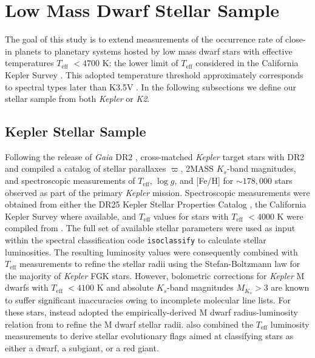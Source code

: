 \documentclass[twocolumn]{emulateapj}
\newcommand{\gaia}[1]{\emph{Gaia}#1}
\newcommand{\kepler}[1]{\emph{Kepler}#1}
\newcommand{\ktwo}[1]{\emph{K2}#1}
\newcommand{\teff}[1]{$T_{\text{eff}}$#1}
\newcommand{\logg}[1]{$\log{g}$#1}
\begin{document}
\section{Low Mass Dwarf Stellar Sample} \label{sect:stars}
The goal of this study is to extend measurements of the occurrence rate of close-in planets to planetary systems hosted
by low mass dwarf stars with effective temperatures \teff{} $<4700$ K: the lower limit of \teff{}
considered in the California Kepler Survey \citep[CKS;][]{fulton17}.
This adopted temperature threshold approximately corresponds to spectral types later than
K3.5V \citep{pecaut13}. In the following subsections we define our stellar sample from both \kepler{} or \ktwo{.}

\subsection{Kepler Stellar Sample} \label{sect:kep}
Following the release of \gaia{} DR2 \citep{lindegren18}, \cite{berger18} cross-matched \kepler{} target stars
with DR2 and compiled a catalog of stellar
parallaxes $\varpi$, 2MASS $K_s$-band magnitudes, and spectroscopic measurements of \teff{,} \logg{,} and [Fe/H]
for $\sim 178,000$ stars observed as part of the primary \kepler{} mission. Spectroscopic measurements were obtained from
either the DR25
Kepler Stellar Properties Catalog \citep[KSPC;][]{mathur17}, the California
Kepler Survey \citep[CKS;][]{petigura17} where available, and \teff{} values for stars with \teff{} $<4000$ K were compiled from
\cite{gaidos16}. The full set of available stellar parameters were used as input within the spectral classification code
\texttt{isoclassify} \citep{huber17} to calculate stellar luminosities. The resulting luminosity values were consequently combined
with \teff{} measurements to refine the stellar radii using the Stefan-Boltzmann law for the majority of \kepler{} FGK stars.
However, bolometric corrections for \kepler{} M dwarfs with \teff{} $<4100$ K
and absolute $K_s$-band magnitudes $M_{K_s}>3$ are known to suffer significant inaccuracies owing to incomplete
molecular line lists. For these stars, \cite{berger18} instead adopted the empirically-derived M dwarf radius-luminosity
relation from \cite{mann15} to refine the M dwarf stellar radii. \cite{berger18} also combined the \teff{} 
luminosity measurements to derive stellar evolutionary flags aimed at classifying stars as either a dwarf, a subgiant, or a
red giant.
\end{document}
